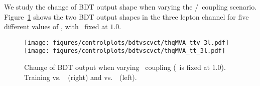 We study the change of BDT output shape when varying the \CV/\Ct\ coupling scenario.
Figure~\ref{fig:bdtvscvct} shows the two BDT output shapes in the three lepton channel for five different values of \Ct, with \CV\ fixed at $1.0$.
\begin{figure} [!h]
  \centering
  \texttt{[image: figures/controlplots/bdtvscvct/thqMVA\_ttv\_3l.pdf]}
  \texttt{[image: figures/controlplots/bdtvscvct/thqMVA\_tt\_3l.pdf]} \\
\caption{Change of BDT output when varying \Ct\ coupling (\CV\ is fixed at $1.0$). Training vs.\ \ttV\ (right) and vs.\ \ttbar\ (left).}
\label{fig:bdtvscvct}
\end{figure}
